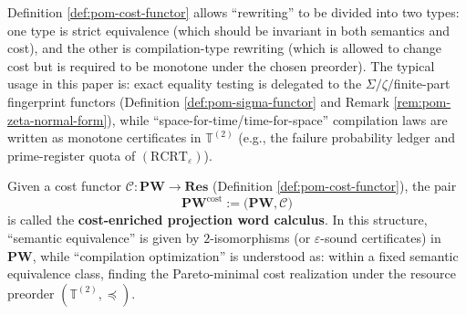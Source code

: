 \begin{remark}\label{rem:pom-cost-invariant-vs-monotone}
Definition \ref{def:pom-cost-functor} allows ``rewriting'' to be divided into two types: one type is strict equivalence (which should be invariant in both semantics and cost), and the other is compilation-type rewriting (which is allowed to change cost but is required to be monotone under the chosen preorder).
The typical usage in this paper is: exact equality testing is delegated to the \(\Sigma/\zeta/\)finite-part fingerprint functors (Definition \ref{def:pom-sigma-functor} and Remark \ref{rem:pom-zeta-normal-form}), while ``space-for-time/time-for-space'' compilation laws are written as monotone certificates in \(\mathbb{T}^{(2)}\) (e.g., the failure probability ledger and prime-register quota of \((\mathrm{RCRT}_\varepsilon)\)).
\end{remark}

\begin{definition}\label{def:pom-pw-cost}
Given a cost functor \(\mathcal{C}:\mathbf{PW}\to\mathbf{Res}\) (Definition \ref{def:pom-cost-functor}), the pair
\[
\mathbf{PW}^{\mathrm{cost}}:=\bigl(\mathbf{PW},\mathcal{C}\bigr)
\]
is called the \textbf{cost-enriched projection word calculus}.
In this structure, ``semantic equivalence'' is given by \(2\)-isomorphisms (or \(\varepsilon\)-sound certificates) in \(\mathbf{PW}\), while ``compilation optimization'' is understood as: within a fixed semantic equivalence class, finding the Pareto-minimal cost realization under the resource preorder \((\mathbb{T}^{(2)},\preceq)\).
\end{definition}

